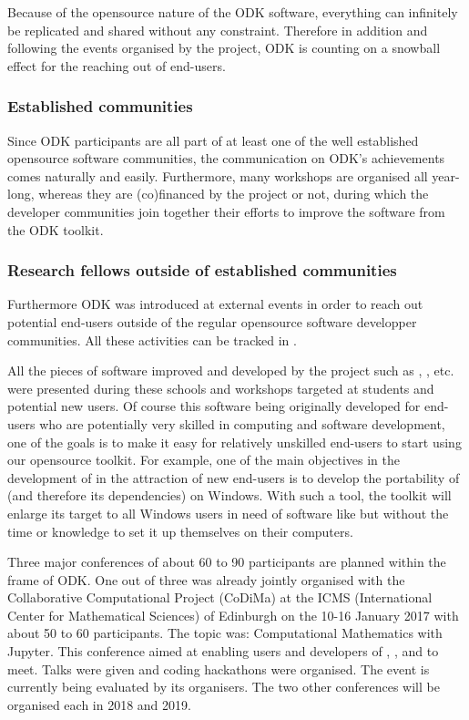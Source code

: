 \documentclass{deliverablereport}
\begin{document}
Because of the opensource nature of the ODK software, everything can infinitely be replicated and shared without any constraint. Therefore in addition and following the events organised by the project, ODK is counting on a snowball effect for the reaching out of end-users.

\subsubsection{Established communities}

Since ODK participants are all part of at least one of the well established opensource software communities, the communication on ODK's achievements comes naturally and easily. Furthermore, many workshops are organised all year-long, whereas they are (co)financed by the project or not, during which the developer communities join together their efforts to improve the software from the ODK toolkit.

\subsubsection{Research fellows outside of established communities}

Furthermore ODK was introduced at external events in order to reach out potential end-users outside of the regular opensource software developper communities.
All these activities can be tracked in .


All the pieces of software improved and developed by the project such as \Sage, \Singular, etc. were presented during these schools and workshops targeted at students and potential new users. Of course this software being originally developed for end-users who are potentially very skilled in computing and software development, one of the goals is to make it easy  for relatively unskilled end-users to start using our opensource toolkit.
For example, one of the main objectives in the development of \Sage in the attraction of new end-users is to develop the portability of \Sage (and therefore its dependencies) on Windows. With such a tool, the toolkit will enlarge its target to all Windows users in need of software like \Sage but without the time or knowledge to set it up themselves on their computers.

Three major conferences of about 60 to 90 participants are planned within the frame of ODK. One out of three was already jointly organised with the Collaborative Computational Project (CoDiMa) at the ICMS (International Center for Mathematical Sciences) of Edinburgh on the 10-16 January 2017 with about 50 to 60 participants. The topic was: Computational Mathematics with Jupyter. This conference aimed at enabling users and developers of \GAP, \Singular, \Sage and \Jupyter to meet. Talks were given and coding hackathons were organised. The event is currently being evaluated by its organisers.
The two other conferences will be organised each in 2018 and 2019.
\end{document}
